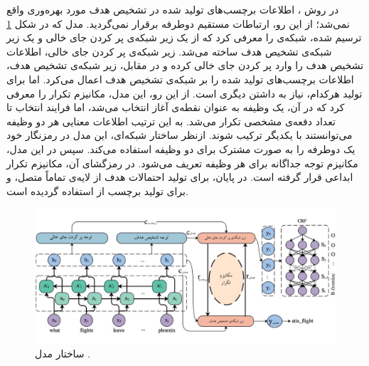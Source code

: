 در روش ، اطلاعات برچسب‌های تولید شده در تشخیص هدف مورد بهره‌وری واقع نمی‌شد؛ از این رو، ارتباطات مستقیم دوطرفه برقرار نمی‌گردید. مدل  \cite{e:2019} که در شکل \ref{Fig:interrelated} ترسیم شده، شبکه‌ی  را معرفی کرد که از یک زیر شبکه‌ی پر کردن جای خالی و یک زیر شبکه‌ی تشخیص هدف ساخته می‌شد. زیر شبکه‌ی پر کردن جای خالی، اطلاعات تشخیص هدف را وارد پر کردن جای خالی کرده و در مقابل، زیر شبکه‌ی تشخیص هدف، اطلاعات برچسب‌های تولید شده را بر شبکه‌ی تشخیص هدف اعمال می‌کرد. اما برای تولید هرکدام، نیاز به داشتن دیگری است. از این رو، این مدل، مکانیزم تکرار را معرفی کرد که در آن، یک وظیفه به عنوان نقطه‌ی آغاز انتخاب می‌شد، اما فرایند انتخاب تا تعداد دفعه‌ی مشخصی تکرار می‌شد. به این ترتیب اطلاعات معنایی هر دو وظیفه می‌توانستند با یکدیگر ترکیب شوند. ازنظر ساختار شبکه‌ای، این مدل در رمزنگار خود یک  دوطرفه را به صورت مشترک برای دو وظیفه استفاده می‌کند. سپس در این مدل، مکانیزم توجه جداگانه برای هر وظیفه تعریف می‌شود. در رمزگشای آن، مکانیزم تکرار ابداعی قرار گرفته است. در پایان، برای تولید احتمالات هدف از لایه‌ی تماماً متصل، و برای تولید برچسب از  استفاده گردیده است.
\begin{figure}[!htb]
	\centering
	\includegraphics[scale=0.45]{Figures/interrelated.pdf}
	\caption[ساختار مدل ]{ساختار مدل  \cite{e:2019}.}
	\label{Fig:interrelated}
\end{figure}


